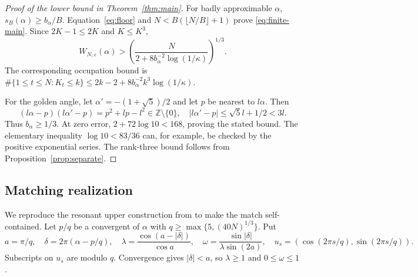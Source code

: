 \begin{proof}[Proof of the lower bound in Theorem~\ref{thm:main}]
For badly approximable $\alpha$, $s_B(\alpha)\ge b_\alpha/B$.
Equation~\eqref{eq:floor} and $N<B(\lfloor N/B\rfloor+1)$ prove
\eqref{eq:finite-main}. Since $2K-1\le2K$ and $K\le K^3$,
\begin{equation}\label{eq:crude}
 W_{N,\varepsilon}(\alpha)
 >\left(\frac{N}{2+8b_\alpha^{-2}\log(1/\kappa)}\right)^{1/3}.
\end{equation}
The corresponding occupation bound is
$\#\{1\le t\le N:K_t\le k\}\le 2k-2+
8b_\alpha^{-2}k^3\log(1/\kappa)$.

For the golden angle, let $\alpha'=-(1+\sqrt5)/2$ and let $p$ be
nearest to $l\alpha$. Then
\[
 (l\alpha-p)(l\alpha'-p)=p^2+lp-l^2\in\mathbb Z\setminus\{0\},
 \quad |l\alpha'-p|\le\sqrt5l+1/2<3l.
\]
Thus $b_\alpha\ge1/3$. At zero error,
$2+72\log 10<168$, proving the stated bound. The elementary inequality
$\log10<83/36$ can, for example, be checked by the positive exponential
series. The rank-three bound follows from Proposition~\ref{prop:separate}.
\end{proof}

\subsection{Matching realization}
We reproduce the resonant upper construction from \cite{GTF33,GTF34}
to make the match self-contained. Let $p/q$ be a convergent of $\alpha$
with $q\ge\max\{5,(40N)^{1/3}\}$. Put
\[
 a=\pi/q,\quad \delta=2\pi(\alpha-p/q),\quad
 \lambda=\frac{\cos(a-|\delta|)}{\cos a},\quad
 \omega=\frac{\sin|\delta|}{\lambda\sin(2a)},\quad
 u_s=(\cos(2\pi s/q),\sin(2\pi s/q)).
\]
Subscripts on $u_s$ are modulo $q$. Convergence gives $|\delta|<a$,
so $\lambda\ge1$ and $0\le\omega\le1$.

